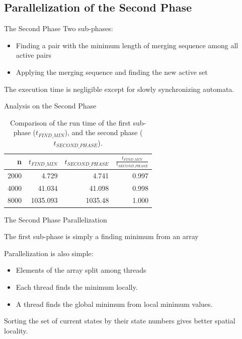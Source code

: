 \documentclass{beamer}
\begin{document}
\subsection{Parallelization of the Second Phase}
\begin{frame}{The Second Phase}
	Two sub-phases:
	\begin{itemize}
		\item Finding a pair with the minimum length of merging sequence among all active pairs
		\item Applying the merging sequence and finding the new active set
	\end{itemize}
	
	The execution time is negligible except for slowly synchronizing automata.
\end{frame}

\begin{frame}{Analysis on the Second Phase}
\begin{table}[ht]
	\begin{tabular}{r|rrr}
			
		n & $t_{FIND\_MIN}$ & $t_{SECOND\_PHASE}$ & $\frac{t_{FIND\_MIN}}{t_{SECOND\_PHASE}}$ \\\hline
		2000 & 4.729 & 4.741 & 0.997 \\
		4000 & 41.034 & 41.098 & 0.998 \\
		8000 & 1035.093 & 1035.48 & 1.000 \\
	\end{tabular}
	
	\caption{Comparison of the run time of the first sub-phase ($t_{FIND\_MIN}$), and the second phase ($t_{SECOND\_PHASE}$).}
	\label{table:phase-2-comparison}
\end{table}
\end{frame}

\begin{frame}{The Second Phase Parallelization}

	The first sub-phase is simply a finding minimum from an array
	
	\medskip
	
	Parallelization is also simple:
	\begin{itemize}
		\item Elements of the array split among threads
		\item Each thread finds the minimum locally.
		\item A thread finds the global minimum from local minimum values. 
	\end{itemize}
	
	\medskip
	
	Sorting the set of current states by their state numbers gives better spatial locality. 
\end{frame}
\end{document}
